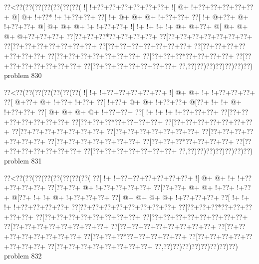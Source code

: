 \vbox{\vbox{\goo
\0??<\0??(\0??(\0??(\0??(\0??(\0??(\0??(
\- ![\- !+\0??+\0??+\0??+\0??+\0??+\0??+
\- ![\- @+\- !+\0??+\0??+\0??+\0??+\0??+
\- @[\- @+\- !+\0??*\- !+\- !+\0??+\0??+
\0??[\- !+\- @+\- @+\- @+\- !+\0??+\0??+
\0??[\- !+\- @+\0??+\- @+\- !+\0??+\0??+
\- @[\- @+\- @+\- @+\- !+\- !+\0??+\0??+
\- ![\- !+\- !+\- !+\- !+\- @+\- @+\0??+
\- @[\- @+\- @+\- @+\- @+\0??+\0??+\0??+
\0??[\0??+\0??+\0??*\0??+\0??+\0??+\0??+
\0??[\0??+\0??+\0??+\0??+\0??+\0??+\0??+
\0??[\0??+\0??+\0??+\0??+\0??+\0??+\0??+
\0??[\0??+\0??+\0??+\0??+\0??+\0??+\0??+
\0??[\0??+\0??+\0??+\0??+\0??+\0??+\0??+
\0??[\0??+\0??+\0??+\0??+\0??+\0??+\0??+
\0??[\0??+\0??+\0??*\0??+\0??+\0??+\0??+
\0??[\0??+\0??+\0??+\0??+\0??+\0??+\0??+
\0??[\0??+\0??+\0??+\0??+\0??+\0??+\0??+
\0??,\0??)\0??)\0??)\0??)\0??)\0??)\0??)
}
\hfil problem 830\hfil\break
}

\vbox{\vbox{\goo
\0??<\0??(\0??(\0??(\0??(\0??(\0??(\0??(
\- ![\- !+\- !+\0??+\0??+\0??+\0??+\0??+
\- ![\- @+\- @+\- !+\- !+\0??+\0??+\0??+
\0??[\- @+\0??+\- @+\- !+\0??+\- !+\0??+
\0??[\- !+\0??+\- @+\- @+\- !+\0??+\0??+
\- @[\0??+\- !+\- !+\- @+\- !+\0??+\0??+
\0??[\- @+\- @+\- @+\- @+\- !+\0??+\0??+
\0??[\- !+\- !+\- !+\- !+\0??+\0??+\0??+
\0??[\0??+\0??+\0??+\0??+\0??+\0??+\0??+
\0??[\0??+\0??+\0??*\0??+\0??+\0??+\0??+
\0??[\0??+\0??+\0??+\0??+\0??+\0??+\0??+
\0??[\0??+\0??+\0??+\0??+\0??+\0??+\0??+
\0??[\0??+\0??+\0??+\0??+\0??+\0??+\0??+
\0??[\0??+\0??+\0??+\0??+\0??+\0??+\0??+
\0??[\0??+\0??+\0??+\0??+\0??+\0??+\0??+
\0??[\0??+\0??+\0??*\0??+\0??+\0??+\0??+
\0??[\0??+\0??+\0??+\0??+\0??+\0??+\0??+
\0??[\0??+\0??+\0??+\0??+\0??+\0??+\0??+
\0??,\0??)\0??)\0??)\0??)\0??)\0??)\0??)
}
\hfil problem 831\hfil\break
}

\vbox{\vbox{\goo
\0??<\0??(\0??(\0??(\0??(\0??(\0??(\0??(\0??(
\0??[\- !+\- !+\0??+\0??+\0??+\0??+\0??+\0??+
\- ![\- @+\- @+\- !+\- !+\0??+\0??+\0??+\0??+
\0??[\0??+\0??+\- @+\- !+\0??+\0??+\0??+\0??+
\0??[\0??+\0??+\- @+\- @+\- !+\0??+\- !+\0??+
\- @[\0??+\- !+\- !+\- @+\- !+\0??+\0??+\0??+
\0??[\- @+\- @+\- @+\- @+\- !+\0??+\0??+\0??+
\0??[\- !+\- !+\- !+\- !+\0??+\0??+\0??+\0??+
\0??[\0??+\0??+\0??+\0??+\0??+\0??+\0??+\0??+
\0??[\0??+\0??+\0??*\0??+\0??+\0??+\0??+\0??+
\0??[\0??+\0??+\0??+\0??+\0??+\0??+\0??+\0??+
\0??[\0??+\0??+\0??+\0??+\0??+\0??+\0??+\0??+
\0??[\0??+\0??+\0??+\0??+\0??+\0??+\0??+\0??+
\0??[\0??+\0??+\0??+\0??+\0??+\0??+\0??+\0??+
\0??[\0??+\0??+\0??+\0??+\0??+\0??+\0??+\0??+
\0??[\0??+\0??+\0??*\0??+\0??+\0??+\0??+\0??+
\0??[\0??+\0??+\0??+\0??+\0??+\0??+\0??+\0??+
\0??[\0??+\0??+\0??+\0??+\0??+\0??+\0??+\0??+
\0??,\0??)\0??)\0??)\0??)\0??)\0??)\0??)\0??)
}
\hfil problem 832\hfil\break
}

